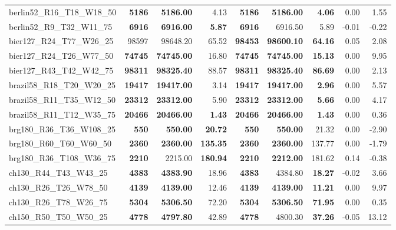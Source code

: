 \documentclass{singlecol-new}
\begin{document}
\begin{scriptsize}
\begin{longtable}{lrrrrrrrr}
		berlin52\_R16\_T18\_W18\_50 & \textbf{5186} & \textbf{5186.00} & 4.13 & \textbf{5186} & \textbf{5186.00} & \textbf{4.06} & 0.00 & 1.55 \\
		berlin52\_R9\_T32\_W11\_75 & \textbf{6916} & \textbf{6916.00} & \textbf{5.87} & \textbf{6916} & 6916.50 & 5.89 & -0.01 & -0.22 \\
		bier127\_R24\_T77\_W26\_25 & 98597 & 98648.20 & 65.52 & \textbf{98453} & \textbf{98600.10} & \textbf{64.16} & 0.05 & 2.08 \\
		bier127\_R24\_T26\_W77\_50 & \textbf{74745} & \textbf{74745.00} & 16.80 & \textbf{74745} & \textbf{74745.00} & \textbf{15.13} & 0.00 & 9.95 \\
		bier127\_R43\_T42\_W42\_75 & \textbf{98311} & \textbf{98325.40} & 88.57 & \textbf{98311} & \textbf{98325.40} & \textbf{86.69} & 0.00 & 2.13 \\
		brazil58\_R18\_T20\_W20\_25 & \textbf{19417} & \textbf{19417.00} & 3.14 & \textbf{19417} & \textbf{19417.00} & \textbf{2.96} & 0.00 & 5.57 \\
		brazil58\_R11\_T35\_W12\_50 & \textbf{23312} & \textbf{23312.00} & 5.90 & \textbf{23312} & \textbf{23312.00} & \textbf{5.66} & 0.00 & 4.17 \\
		brazil58\_R11\_T12\_W35\_75 & \textbf{20466} & \textbf{20466.00} & \textbf{1.43} & \textbf{20466} & \textbf{20466.00} & \textbf{1.43} & 0.00 & 0.36 \\
		brg180\_R36\_T36\_W108\_25 & \textbf{550} & \textbf{550.00} & \textbf{20.72} & \textbf{550} & \textbf{550.00} & 21.32 & 0.00 & -2.90 \\
		brg180\_R60\_T60\_W60\_50 & \textbf{2360} & \textbf{2360.00} & \textbf{135.35} & \textbf{2360} & \textbf{2360.00} & 137.77 & 0.00 & -1.79 \\
		brg180\_R36\_T108\_W36\_75 & \textbf{2210} & 2215.00 & \textbf{180.94} & \textbf{2210} & \textbf{2212.00} & 181.62 & 0.14 & -0.38 \\
		ch130\_R44\_T43\_W43\_25 & \textbf{4383} & \textbf{4383.90} & 18.96 & \textbf{4383} & 4384.80 & \textbf{18.27} & -0.02 & 3.66 \\
		ch130\_R26\_T26\_W78\_50 & \textbf{4139} & \textbf{4139.00} & 12.46 & \textbf{4139} & \textbf{4139.00} & \textbf{11.21} & 0.00 & 9.97 \\
		ch130\_R26\_T78\_W26\_75 & \textbf{5304} & \textbf{5306.50} & 72.20 & \textbf{5304} & \textbf{5306.50} & \textbf{71.95} & 0.00 & 0.35 \\
		ch150\_R50\_T50\_W50\_25 & \textbf{4778} & \textbf{4797.80} & 42.89 & \textbf{4778} & 4800.30 & \textbf{37.26} & -0.05 & 13.12 \\

\end{longtable}
\end{scriptsize}
\end{document}
